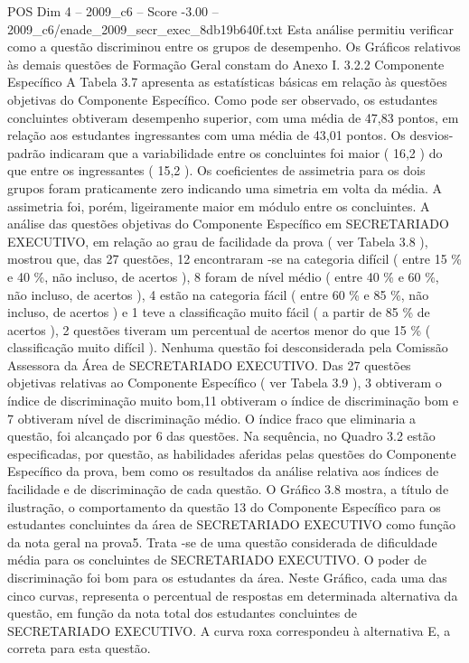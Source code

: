 \begin{textsample}{POS Dim 4 – 2009\_c6 – Score -3.00 – 2009\_c6/enade\_2009\_secr\_exec\_8db19b640f.txt}
Esta análise permitiu verificar como a questão discriminou entre os grupos de desempenho.
Os Gráficos relativos às demais questões de Formação Geral constam do Anexo I. 3.2.2 Componente Específico A Tabela 3.7 apresenta as estatísticas básicas em relação às questões objetivas do Componente Específico.
Como pode ser observado, os estudantes concluintes obtiveram desempenho superior, com uma média de 47,83 pontos, em relação aos estudantes ingressantes com uma média de 43,01 pontos.
Os desvios-padrão indicaram que a variabilidade entre os concluintes foi maior ( 16,2 ) do que entre os ingressantes ( 15,2 ).
Os coeficientes de assimetria para os dois grupos foram praticamente zero indicando uma simetria em volta da média.
A assimetria foi, porém, ligeiramente maior em módulo entre os concluintes.
A análise das questões objetivas do Componente Específico em SECRETARIADO EXECUTIVO, em relação ao grau de facilidade da prova ( ver Tabela 3.8 ), mostrou que, das 27 questões, 12 encontraram -se na categoria difícil ( entre 15 \% e 40 \%, não incluso, de acertos ), 8 foram de nível médio ( entre 40 \% e 60 \%, não incluso, de acertos ), 4 estão na categoria fácil ( entre 60 \% e 85 \%, não incluso, de acertos ) e 1 teve a classificação muito fácil ( a partir de 85 \% de acertos ), 2 questões tiveram um percentual de acertos menor do que 15 \% ( classificação muito difícil ).
Nenhuma questão foi desconsiderada pela Comissão Assessora da Área de SECRETARIADO EXECUTIVO.
Das 27 questões objetivas relativas ao Componente Específico ( ver Tabela 3.9 ), 3 obtiveram o índice de discriminação muito bom,11 obtiveram o índice de discriminação bom e 7 obtiveram nível de discriminação médio.
O índice fraco que eliminaria a questão, foi alcançado por 6 das questões.
Na sequência, no Quadro 3.2 estão especificadas, por questão, as habilidades aferidas pelas questões do Componente Específico da prova, bem como os resultados da análise relativa aos índices de facilidade e de discriminação de cada questão.
O Gráfico 3.8 mostra, a título de ilustração, o comportamento da questão 13 do Componente Específico para os estudantes concluintes da área de SECRETARIADO EXECUTIVO como função da nota geral na prova5.
Trata -se de uma questão considerada de dificuldade média para os concluintes de SECRETARIADO EXECUTIVO.
O poder de discriminação foi bom para os estudantes da área.
Neste Gráfico, cada uma das cinco curvas, representa o percentual de respostas em determinada alternativa da questão, em função da nota total dos estudantes concluintes de SECRETARIADO EXECUTIVO.
A curva roxa correspondeu à alternativa E, a correta para esta questão.

\end{textsample}

